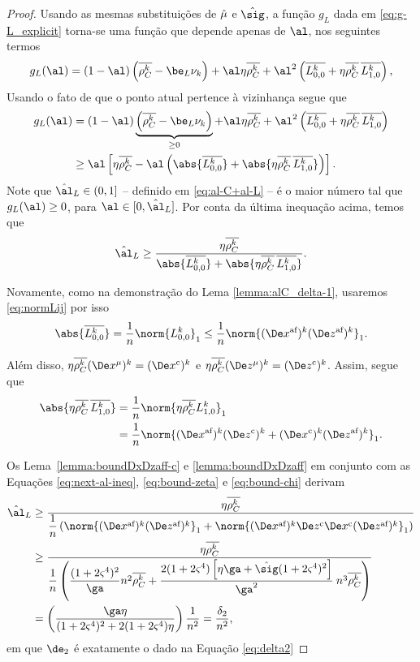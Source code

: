 \begin{proof}

Usando as mesmas substituições de $\hat{\mu}$ e $\nextsig$, a função $g_L$ dada em \eqref{eq:g-L_explicit} torna-se uma função que depende apenas de $\al$, nos seguintes termos 
\[
g_L(\al) =     (1-\al)\left(\rhoCkb  -  \be_L \nuk    \right) +  \al\eta\rhoCkb  + 
   \al^2\left( \dbvec{L_{0,0}^{k}} + \eta\rhoCkb   \,\dbvec{L_{1,0}^{k}}   \right ) ,
	\]
Usando  o fato de que o ponto atual pertence à  vizinhança segue que 
 \[
\begin{aligned}
{g}_L(\al) & =     (1-\al)\underbrace{\left(\rhoCkb  -  \be_L \nuk    \right)}_{\geq 0} +  \al\eta\rhoCkb  + 
   \al^2\left( \dbvec{L_{0,0}^{k}} + \eta\rhoCkb  \, \dbvec{L_{1,0}^{k}}   \right ) \\
   & \geq  \al\left[\eta\rhoCkb  - 
   \al \left(\abs{\dbvec{L_{0,0}^{k}}} + \abs{\eta\rhoCkb\,  \dbvec{L_{1,0}^{k}}}\right)   \right ].
\end{aligned}
 \]
Note que  $\nextal_L\in(0,1]$ -- definido em \eqref{eq:al-C+al-L} -- é o maior número tal que  $g_L(\al)\geq 0$, para  $\al\in[0,\nextal_L]$. Por conta da última inequação acima, temos que 
\begin{equation}
	\label{eq:next-al-ineq}
\nextal_L \geq \frac{\eta\rhoCkb  }{\abs{\dbvec{L_{0,0}^{k}}} + \abs{\eta\rhoCkb \,  \dbvec{L_{1,0}^{k}}}}.
\end{equation}

Novamente, como na demonstração do Lema \ref{lemma:alC_delta-1}, usaremos \eqref{eq:normLij} por isso
\begin{equation}
\abs{\dbvec{L_{0,0}^{k}}}  = \frac{1}{n}\norm{L_{0,0}^{k}}_{1}  \leq \dfrac{1}{n} \norm{ \dekx  \dekz }_1 .  \label{eq:bound-zeta}
\end{equation}

Além disso,  $\eta\rhoCkb (\Dex^\mu)^{k} = \Dekcox $  e $  \eta\rhoCkb (\Dez^\mu)^{k} = \Dekcoz$.
Assim,  segue que
	\begin{align}
	\abs{\eta\rhoCkb \,  \dbvec{L_{1,0}^{k}}} & = \dfrac{1}{n}\norm{\eta\rhoCkb L_{1,0}^{k}}_{1}  \notag \\
	& =  \dfrac{1}{n} \norm{ \dekx \Dekcoz + \Dekcox \dekz }_1.\label{eq:bound-chi}
	\end{align}


Os Lema~\ref{lemma:boundDxDzaff-c} e  \ref{lemma:boundDxDzaff} em conjunto com  as Equações \eqref{eq:next-al-ineq}, \eqref{eq:bound-zeta} e \eqref{eq:bound-chi} derivam 
\[
\begin{aligned}
\nextal_L  & \geq \frac{\eta\rhoCkb  } {\dfrac{1}{n} \left(\norm{ \dekx  \dekz }_1 +  \norm{ \dekx \Decoz  \Decox \dekz }_1 \right) } \\
		   & \geq \dfrac{\eta\rhoCkb  } {\dfrac{1}{n} \left(\dfrac{(1 + 2\bdxzstar^{4})^{2} }{\ga} n^{2}\rhoCkb + \dfrac{2(1+2\bdxzstar^{4})\left[\eta\ga + \nextsig(1+2\bdxzstar^{4})^{2}\right]}{\ga^{2}}\: n^{3}\rhoCkb  \right) } \\
		   & = \left( \dfrac{\ga\eta } {(1 + 2\bdxzstar^{4})^{2}  + 2(1+2\bdxzstar^{4})\eta}\right) \dfrac{1}{n^{2}} = \frac{\delta_{2}}{n^{2}}, 
\end{aligned}
\]
em que $\de_{2}$ é exatamente o dado na Equação \eqref{eq:delta2}
\end{proof}
 

